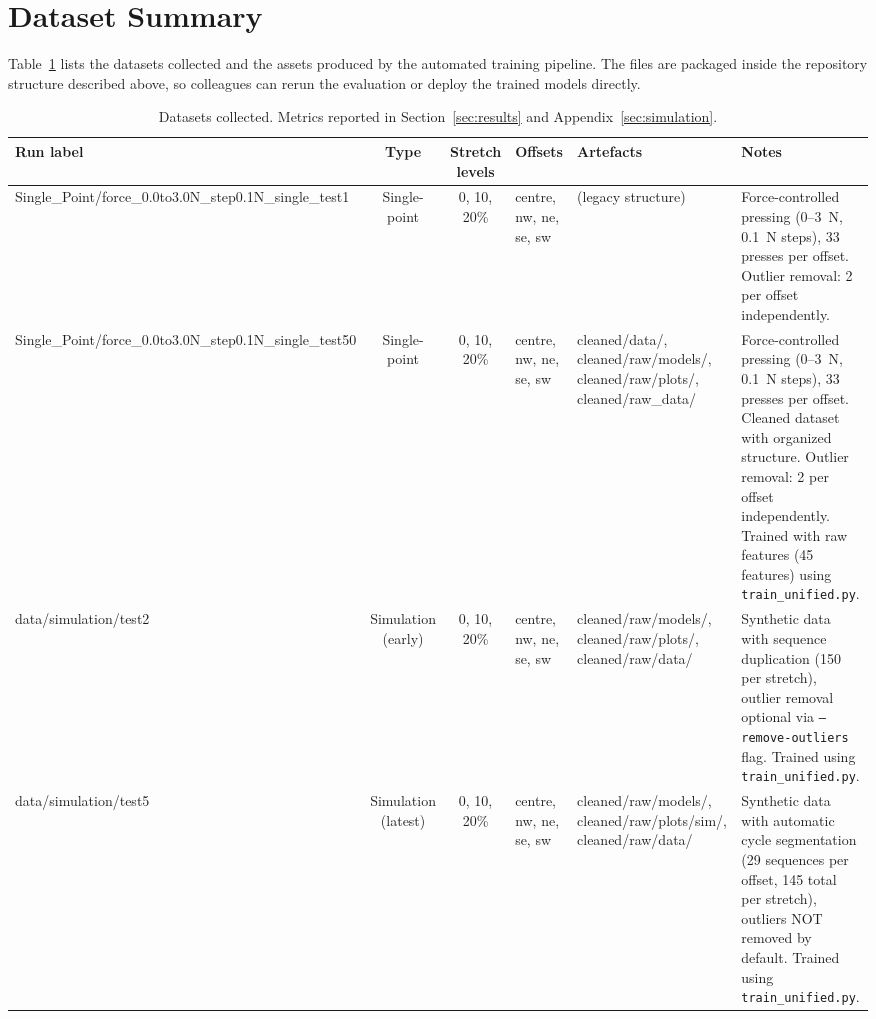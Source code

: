 \documentclass[11pt,a4paper]{article}
\begin{document}
\section{Dataset Summary}
\label{sec:dataset-summary}

Table~\ref{tab:datasets-collected} lists the datasets collected and the assets
produced by the automated training pipeline. The files are packaged inside the repository
structure described above, so colleagues can rerun the evaluation or deploy the trained models
directly.

\begin{table}[H]
    \centering
    \caption{Datasets collected. Metrics reported in Section~\ref{sec:results} and Appendix~\ref{sec:simulation}.}
    \begin{tabularx}{\linewidth}{@{}lcc>{\raggedright\arraybackslash}p{3.5cm}>{\raggedright\arraybackslash}p{2.8cm}>{\raggedright\arraybackslash}X@{}}
        \toprule
        Run label & Type & Stretch levels & Offsets & Artefacts & Notes \\
        \midrule
        Single\_Point/force\_0.0to3.0N\_step0.1N\_single\_test1 & Single-point & 0, 10, 20\% & centre, nw, ne, se, sw & (legacy structure) & Force-controlled pressing (0--3~N, 0.1~N steps), 33 presses per offset. Outlier removal: 2 per offset independently. \\
        Single\_Point/force\_0.0to3.0N\_step0.1N\_single\_test50 & Single-point & 0, 10, 20\% & centre, nw, ne, se, sw & cleaned/data/, cleaned/raw/models/, cleaned/raw/plots/, cleaned/raw\_data/ & Force-controlled pressing (0--3~N, 0.1~N steps), 33 presses per offset. Cleaned dataset with organized structure. Outlier removal: 2 per offset independently. Trained with raw features (45 features) using \texttt{train\_unified.py}. \\
        data/simulation/test2 & Simulation (early) & 0, 10, 20\% & centre, nw, ne, se, sw & cleaned/raw/models/, cleaned/raw/plots/, cleaned/raw/data/ & Synthetic data with sequence duplication (150 per stretch), outlier removal optional via \texttt{--remove-outliers} flag. Trained using \texttt{train\_unified.py}. \\
        data/simulation/test5 & Simulation (latest) & 0, 10, 20\% & centre, nw, ne, se, sw & cleaned/raw/models/, cleaned/raw/plots/sim/, cleaned/raw/data/ & Synthetic data with automatic cycle segmentation (29 sequences per offset, 145 total per stretch), outliers NOT removed by default. Trained using \texttt{train\_unified.py}. \\
        \bottomrule
    \end{tabularx}
    \label{tab:datasets-collected}
\end{table}
\end{document}
